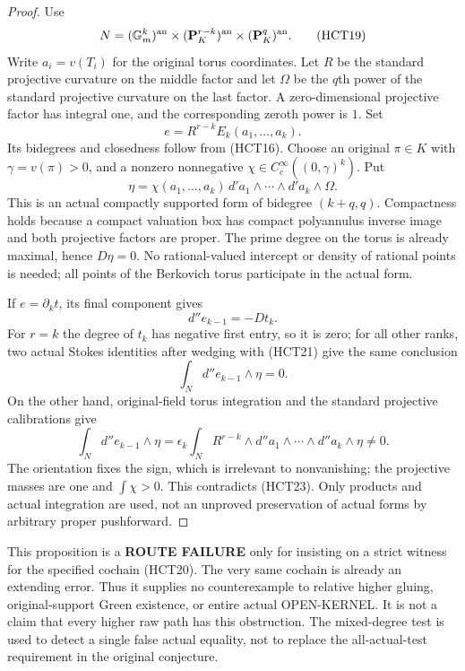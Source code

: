 \begin{proof}
Use
\[
 N=(\mathbb G_m^k)^{\rm an}\times(\mathbf P^{r-k}_K)^{\rm an}
                       \times(\mathbf P^q_K)^{\rm an}.
 \tag{HCT19}
\]
Write $a_i=v(T_i)$ for the original torus coordinates.  Let $R$ be
the standard projective curvature on the middle factor and let
$\Omega$ be the $q$th power of the standard projective curvature
on the last factor.  A zero-dimensional projective factor has
integral one, and the corresponding zeroth power is $1$.  Set
\[
                        e=R^{r-k}E_k(a_1,\ldots,a_k).
 \tag{HCT20}
\]
Its bidegrees and closedness follow from (HCT16).  Choose an original
$\pi\in K$ with $\gamma=v(\pi)>0$, and a nonzero nonnegative
$\chi\in C_c^\infty((0,\gamma)^k)$.  Put
\[
 \eta=\chi(a_1,\ldots,a_k)\,
            d'a_1\wedge\cdots\wedge d'a_k\wedge\Omega.
 \tag{HCT21}
\]
This is an actual compactly supported form of bidegree $(k+q,q)$.
Compactness holds because a compact valuation box has compact
polyannulus inverse image and both projective factors are proper.
The prime degree on the torus is already maximal, hence $D\eta=0$.
No rational-valued intercept or density of rational points is needed;
all points of the Berkovich torus participate in the actual form.

If $e=\partial_k t$, its final component gives
\[
                         d''e_{k-1}=-Dt_k.
 \tag{HCT22}
\]
For $r=k$ the degree of $t_k$ has negative first entry, so it is
zero; for all other ranks, two actual Stokes identities after wedging
with (HCT21) give the same conclusion
\[
                      \int_N d''e_{k-1}\wedge\eta=0.
 \tag{HCT23}
\]
On the other hand, original-field torus integration and the standard
projective calibrations give
\[
 \int_N d''e_{k-1}\wedge\eta
   =\epsilon_k\int_N R^{r-k}\wedge d''a_1\wedge\cdots\wedge d''a_k
                                      \wedge\eta\ne0.
 \tag{HCT24}
\]
The orientation fixes the sign, which is irrelevant to nonvanishing;
the projective masses are one and $\int\chi>0$.  This contradicts
(HCT23).  Only products and actual integration are used, not an
unproved preservation of actual forms by arbitrary proper pushforward.
\end{proof}

This proposition is a \textbf{ROUTE FAILURE} only for insisting on
a strict witness for the specified cochain (HCT20).  The very same
cochain is already an extending error.  Thus it supplies no
counterexample to relative higher gluing, original-support Green
existence, or entire actual OPEN-KERNEL.  It is not a claim that
every higher raw path has this obstruction.  The mixed-degree test
is used to detect a single false actual equality, not to replace the
all-actual-test requirement in the original conjecture.

